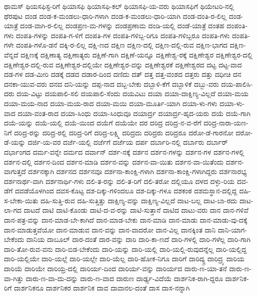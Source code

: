 {ಥಾಮಸ್
ಥಿಯಸಫಿಸ್ಟ-ರಿಗೆ
ಥಿಯಾಸಫಿ
ಥಿಯಾಸಫಿ-ಕಲ್
ಥಿಯಾಸಫಿ-ಯ-ವರು
ಥಿಯಾಸಫಿಗೆ
ಥಿಯೇಟರಿ-ನಲ್ಲಿ
ಥೆರಪುಟ
ದಂಡ
ದಂಡ-ಕ-ಮಂಡಲು-ಧಾರಿ-ಗಳಾಗಿ
ದಂಡ-ಕ-ಮಂಡಲು-ಧಾರಿ-ಯಾಗಿ
ದಂಡ-ದಂತಿ-ರ-ಲಿಲ್ಲ
ದಂಡ-ಯಾತ್ರೆ
ದಂಡ-ವಾಗಿ-ರ-ಲಿಲ್ಲ
ದಂಡಪ್ರಣ-ಮ-ಗಳನ್ನು
ದಂಡಪ್ರಣಾಮ
ದಂಡಿ-ಯಲ್ಲಿ
ದಂಡೆ-ಯಾತ್ರೆ
ದಂತಹ
ದಂಪಂತಿ-ಗಳು
ದಂಪತಿ-ಗಳನ್ನು
ದಂಪತಿ-ಗ-ಳಿಗೆ
ದಂಪತಿ-ಗಳ
ದಂಪತಿ-ಗಳಿಬ್ಬ-ರಿಗೂ
ದಂಪತಿ-ಗಳಿಬ್ಬರೂ
ದಂಪತಿ-ಗಳು
ದಂಪತಿ-ಗಳೇ
ದಂಪತಿ-ಗಳೊ-ಡನೆ
ದಕ್ಕಿ-ರ-ಲಿಲ್ಲ
ದಕ್ಷಿ-ಣದ
ದಕ್ಷಿಣ
ದಕ್ಷಿಣ-ದಲ್ಲಿ
ದಕ್ಷಿಣ-ದಲ್ಲಿ-ರುವ
ದಕ್ಷಿಣ-ಭಾಗದ
ದಕ್ಷಿಣ-ವೆನ್ನದೆ
ದಕ್ಷಿಣಕ್ಕೆ
ದಕ್ಷಿಣಾತ್ಯ
ದಕ್ಷಿಣಾತ್ಯರು
ದಕ್ಷಿಣೆ-ಗಾಗಿ
ದಕ್ಷಿಣೆ-ಯನ್ನೂ
ದಕ್ಷಿಣೇಶ್ವ-ರಕ್ಕೆ
ದಕ್ಷಿಣೇಶ್ವರ
ದಕ್ಷಿಣೇಶ್ವರ-ದಲ್ಲಿ
ದಕ್ಷಿಣೇಶ್ವರ-ದಲ್ಲಿ-ರುವ
ದಕ್ಷಿಣೇಶ್ವರ-ದಲ್ಲಿಯೇ
ದಕ್ಷಿಣೇಶ್ವರ-ವನ್ನು
ದಕ್ಷಿಣೇಶ್ವರಕೆ
ದಕ್ಷಿಣೇಶ್ವರದ
ದಟ್ಟ
ದಟ್ಟ-ವಾದ
ದಡ-ಗಳ
ದಡ-ಮೀರಿ
ದಡಕ್ಕೆ
ದಡದ
ದಡಾರ-ದಿಂದ
ದಣಿದು
ದತ್
ದತ್ತ
ದತ್ತ-ವಂಶದ
ದತ್ತರು
ದತ್ತು
ದಧೀಚಿ
ದನ
ದನಕಾ-ಯುವ-ವರು
ದನದ
ದನಿ-ಯನ್ನು
ದಪ್ಪ-ನಾದ
ದಬ್ಬ-ಬೇಕು
ದಬ್ಬಾಳಿ-ಕೆಗೆ
ದಬ್ಬಾಳಿಕೆ
ದಬ್ಬು-ವರು
ದಯ-ಪಾಲಿಸಿ-ದರು
ದಯ-ವಿಟ್ಟು
ದಯಪಾಲಿ-ಸಲಿ
ದಯಪಾಲಿ-ಸೆಂದು
ದಯವಿಟು
ದಯಾ
ದಯಾ-ದಾಕ್ಷಿಣ್ಯ-ವಿಲ್ಲದೆ
ದಯಾ-ಮಯ
ದಯಾ-ಮಯ-ನಾದ
ದಯಾ-ಮಯ-ರಾದ
ದಯಾ-ಮಯಿ
ದಯಾ-ಮೂರ್ತಿ-ಯಾಗಿ
ದಯಾ-ಳು-ಗಳು
ದಯಾ-ಳು-ವಾದ
ದಯಾ-ವಂತ-ರಾದ
ದಯಾ-ಸಿಂಧು
ದಯಾ-ಸಿಂಧುವೂ
ದಯಾರ್ದ್ರ
ದಯಾರ್ದ್ರ-ಹೃದ-ಯರು
ದಯೆ
ದಯೆ-ಗಾಗಿ
ದಯೆ-ಯನ್ನು
ದಯೆ-ಯಲ್ಲಿ
ದಯೆ-ಯಿಂದ
ದಯೆಗೆ
ದಯೆಯೇ
ದರ
ದರಿದ್ರ
ದರಿದ್ರ-ನ-ವ-ರೆಗೆ
ದರಿದ್ರ-ನಾರಾ-ಯಣ-ನಿಗೆ
ದರಿದ್ರ-ರನ್ನು
ದರಿದ್ರ-ರಲ್ಲಿ
ದರಿದ್ರ-ರಿಗೆ
ದರಿದ್ರ-ಲಕ್ಷ್ಮಿ
ದರಿದ್ರದು
ದರಿದ್ರರು
ದರಿದ್ರರೂ
ದರೋ-ಡೆ-ಗಾರನೋ
ದರೋ-ಡೆ-ಯನ್ನು
ದರ್ಜಿ-ಯ-ವರ
ದರ್ಜೆ-ಯಲ್ಲಿ
ದರ್ಜೆಗೆ
ದರ್ಜೆಯ
ದರ್ಪ
ದರ್ಬಾರಿ-ನಲ್ಲಿ
ದರ್ಬಾರು
ದರ್ಬಾರ್
ದರ್ಭಾಂಗದ
ದರ್ಮ-ವನ್ನೇ
ದರ್ಮದ
ದರ್ವಾನ್
ದರ್ಶ-ನಕ್ಕೆ
ದರ್ಶನ
ದರ್ಶನ-ಗಳನ್ನು
ದರ್ಶನ-ಗಳ
ದರ್ಶನ-ಗಳಲ್ಲಿ
ದರ್ಶನ-ದಲ್ಲಿ
ದರ್ಶನ-ದಿಂದ
ದರ್ಶನ-ಮಾಡಿ
ದರ್ಶನ-ವನ್ನು
ದರ್ಶನ-ವಾ-ಯಿತು
ದರ್ಶನ-ವಾ-ಯಿತೆಂದು
ದರ್ಶನ-ವಾಗುತ್ತದೆ
ದರ್ಶನಕ್ಕಾಗಿ
ದರ್ಶನದ
ದರ್ಶನವೂ
ದರ್ಶನಾ-ಕಾಂಕ್ಷಿ-ಗಳಾಗಿ
ದರ್ಶನಾ-ಕಾಂಕ್ಷಿ-ಗಳಾಗಿದ್ದರು
ದರ್ಶನಾರಭ್ಯ
ದರ್ಶನಾರ್ಥ-ವಾಗಿ
ದರ್ಶನಾರ್ಥಿ-ಗಳು
ದಲಿ-ತ-ರನ್ನು
ದಲಿ-ತ-ರಿಗೆ
ದಲಿ-ತರೋ
ದಲ್ಲಿಯೂ
ದಳದ
ದಳ್ಳು-ರಿಯ
ದವ-ಡೆಗೆ
ದವಡೆಯೊಳಗಿಂದ
ದವಸ-ಕೊಟ್ಟ
ದಶ-ದಿಕ್ಕು-ಗಳಿಂದಲೂ
ದಶ-ದಿಕ್ಕು-ಗಳೂ
ದಶಕಂಠ
ದಶಮಸ್ಥಾನ-ದಲ್ಲಿದ್ದ
ದಹಿ-ಸ-ಬೇಕಾ-ಯಿತು
ದಹಿ-ಸುತ್ತಿ-ರುವ
ದಹಿ-ಸುತ್ತಿತ್ತು
ದಾಕ್ಷಿಣ್ಯ-ವನ್ನು
ದಾಕ್ಷಿಣ್ಯ-ವಿಲ್ಲದೆ
ದಾಟ-ಬಲ್ಲ
ದಾಟ-ಬಾ-ರದು
ದಾಟ-ಲಾ-ಗದ
ದಾಟದೆ
ದಾಟಿ
ದಾಟಿ-ಕೊಂಡು
ದಾಟಿ-ದ-ವ-ರನ್ನು
ದಾಟಿ-ಸುತ್ತಾನೆ
ದಾಟಿದ
ದಾಟು-ವರು
ದಾನ
ದಾನ-ಗಳಿವೆ
ದಾನ-ಪತ್ರ-ವನ್ನು
ದಾನ-ಮಾಡ-ಬೇ-ಕಾಗಿದೆ
ದಾನ-ಮಾಡ-ಬೇಕು
ದಾನ-ಮಾಡಿ
ದಾನ-ಮಾಡು
ದಾನ-ಮಾಡು-ವು-ದಕ್ಕೆ
ದಾನ-ಮಾಡುತ್ತವೆಯೋ
ದಾನ-ಮಾಡುವ
ದಾನ-ವನ್ನು
ದಾನ-ವಾದರೋ
ದಾನ-ವಿಲ್ಲ
ದಾನಕ್ಕಿಂತ
ದಾನಿ
ದಾನಿ-ಯಾಗ-ಬೇಕೆಂದು
ದಾನಿಯ
ದಾಬೂಲ್
ದಾರ-ದಂತೆ
ದಾರ-ವನ್ನು
ದಾರಿ
ದಾರಿ-ಕಾ-ಣದೆ
ದಾರಿ-ಗಳಲ್ಲಿ
ದಾರಿ-ಗಳೆಲ್ಲ
ದಾರಿ-ಗಾಗಿ
ದಾರಿ-ತೋ-ರುವ-ವನು
ದಾರಿ-ಬಿಡ-ಬೇಕೆಂದು
ದಾರಿ-ಯನ್ನು
ದಾರಿ-ಯಲ್ಲಿ
ದಾರಿ-ಯಲ್ಲಿ-ರುವುದನ್ನೆಲ್ಲ
ದಾರಿ-ಯಲ್ಲಿದ್ದ
ದಾರಿ-ಯಲ್ಲಿಯೇ
ದಾರಿ-ಯಲ್ಲೆ
ದಾರಿ-ಯಲ್ಲೇ
ದಾರಿ-ಯೆಲ್ಲ
ದಾರಿ-ಹೋಕ-ನಿಗೂ
ದಾರಿಗೆ
ದಾರಿದ್ಯ್ರ
ದಾರಿದ್ರ್ಯ
ದಾರಿಯ
ದಾರಿಯೆ
ದಾರಿಯೇ
ದಾರಿಯ್ರ-ದಲ್ಲಿ
ದಾರಿರ್ಯ-ದಿಂದ
ದಾರಿರ್ಯ-ವನ್ನು
ದಾರಿರ್ಯದ
ದಾರು-ಣ-ಯಾ-ತನೆ
ದಾರು-ಣ-ವಾ-ಗಿತ್ತು
ದಾರು-ಣ-ವಾ-ದು-ದನ್ನು
ದಾರು-ಣ-ವಾದ
ದಾರುಣ
ದಾರ್ಢ್ಯ-ವಿದೆಯೆ
ದಾರ್ಶನಿಕ-ರಾಗಿ-ದ್ದರೂ
ದಾರ್ಶನಿಕ-ರಿಗೆ
ದಾರ್ಶನಿಕನೂ
ದಾರ್ಶನಿಕರ
ದಾರ್ಶನಿಕ
ದಾವ
ದಾವಾನಲ-ದಂತೆ
ದಾಸ
ದಾಸ-ನನ್ನಾಗಿ
}
